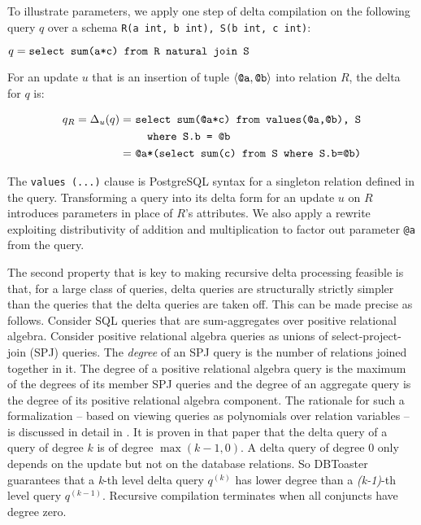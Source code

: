 To illustrate parameters, we
apply one step of delta compilation on the following query $q$ over
a schema {\tt R(a int, b int), S(b int, c int)}:

$q = \mbox{\tt select sum(a*c) from R natural join S}$

\vspace{1mm}
\noindent For an update $u$ that is an insertion of tuple
${\langle\mbox{{\tt @a}}, \mbox{{\tt @b}}\rangle}$
into relation $R$, the delta for $q$ is:

\vspace{-6mm}
\begin{align*}
q_R =
\Delta_{u}(q) =
      & \ \mbox{\tt select sum(@a*c) from values(@a,@b), S}\\ 
      & \ \mbox{\tt \ \ where S.b = @b}\\
    = & \ \mbox{\tt @a*(select sum(c) from S where S.b=@b)}
\end{align*}

\vspace{-2mm}
\noindent The {\tt values (...)}
clause is PostgreSQL syntax for a singleton relation defined in the query.
Transforming a query into its delta form for an update $u$ on $R$ introduces
parameters in place of $R$'s attributes. We also apply a rewrite
exploiting distributivity of addition and multiplication to factor out parameter
{\tt @a} from the query.

The second property that is key to making recursive delta processing feasible is
that, for a large class of queries, delta queries are structurally strictly
simpler than the queries that the delta queries are taken off. This can be made
precise as follows. Consider SQL queries that are sum-aggregates over positive
relational algebra. Consider positive relational algebra queries as unions of
select-project-join (SPJ) queries. The {\em degree} of an SPJ query is the
number of relations joined together in it. The degree of a positive relational
algebra query is the maximum of the degrees of its member SPJ queries and the
degree of an aggregate query is the degree of its positive relational algebra
component.
The rationale for such a formalization -- based on viewing queries as
polynomials over relation variables -- is discussed in detail in
\cite{koch-pods:10}. It is proven in that paper that the delta query of a
query of degree $k$ is of degree $\max(k - 1, 0)$. A delta query of degree $0$
only depends on the update but not on the database relations.
So DBToaster guarantees that a \textit{k}-th level delta query $q^{(k)}$ has lower
degree than a \textit{(k-1)}-th level query $q^{(k-1)}$.
Recursive compilation terminates when all conjuncts have degree zero.

